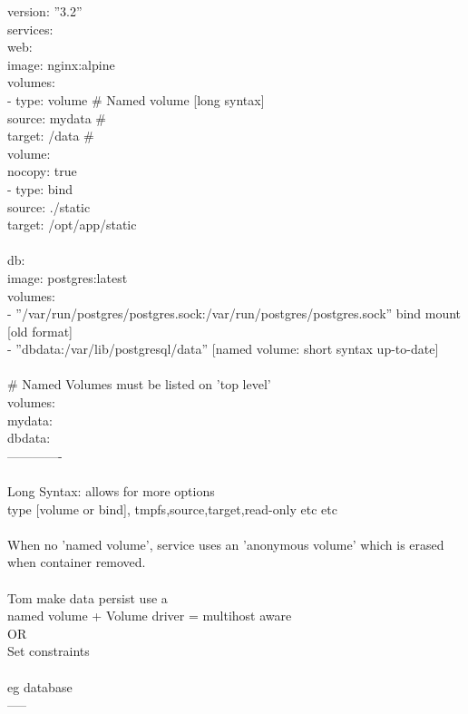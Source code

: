 \documentclass[10pt,a4paper]{article}
\begin{document}
{{{{{{{{{version: ''3.2''\\
services:\\
  web:\\
    image: nginx:alpine\\
    volumes:\\
      - type: volume      \# Named volume [long syntax]\\
        source: mydata  \#\\
        target: /data       \#\\
        volume:\\
          nocopy: true\\
      - type: bind                   \\
        source: ./static            \\
        target: /opt/app/static}{\large {\large   \\
\\
  db:\\
    image: postgres:latest\\
    volumes:\\
      - ''/var/run/postgres/postgres.sock:/var/run/postgres/postgres.sock''    bind mount [old format]\\
      - ''dbdata:/var/lib/postgresql/data'' [named volume: short syntax    up-to-date]}{\large \\
\\
\# Named Volumes must be listed on 'top level'\\
volumes:\\
  mydata:\\
  dbdata:}{\large \\
-------------\\
\\
Long Syntax: allows for more options\\
type [volume or bind], tmpfs,source,target,read-only etc etc\\
\\
When no 'named volume', service uses an 'anonymous volume' which is erased when container removed.\\
\\
Tom make data persist use a \\
named volume + Volume driver = multihost aware\\
OR\\
Set constraints\\
\\
eg database\\
-----\\
}}}}}}}}}}
\end{document}
